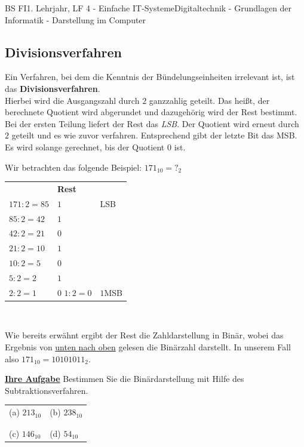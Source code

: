 \documentclass[11pt,twocolumn,oneside,openany,headings=optiontotoc,11pt,numbers=noenddot]{article}
\begin{document}
\begin{worksheet}{BS FI}{1. Lehrjahr, LF 4 - Einfache IT-Systeme}{Digitaltechnik - Grundlagen der Informatik - Darstellung im Computer}
	 	\subsection*{Divisionsverfahren}
	 	Ein Verfahren, bei dem die Kenntnis der Bündelungseinheiten irrelevant ist, ist das \textbf{Divisionsverfahren}.\\
	 	Hierbei wird die Ausgangszahl durch \(2\) ganzzahlig geteilt. Das heißt, der berechnete Quotient wird abgerundet und dazugehörig wird der Rest bestimmt. Bei der ersten Teilung liefert der Rest das \textit{LSB}. Der Quotient wird erneut durch \(2\) geteilt und es wie zuvor verfahren. Entsprechend gibt der letzte Bit das MSB.\\
	 	Es wird solange gerechnet, bis der Quotient \(0\) ist.\\
	 	\par\noindent
	 	Wir betrachten das folgende Beispiel: \(171_{10} = ?_{2}\)\\
	 	\begin{tabularx}{0.45\textwidth}{XMl}
	 		& \textbf{Rest} & \\
	 		\(171 : 2 = 85\) & \(1\) & LSB\\
	 		\(85 : 2 = 42\) & \(1\)\\
	 		\(42 : 2 = 21\) & \(0\)\\
	 		\(21 : 2 = 10\) & \(1\)\\
	 		\(10 : 2 = 5\) & \(0\)\\
	 		\(5 : 2 = 2\) & \(1\)\\
	 		\(2 : 2 = 1\) & \(0\)
	 		\(1 : 2 = 0\) & \(1\)MSB\\
	 	\end{tabularx}\\
	 	\par\noindent
 		Wie bereits erwähnt ergibt der Rest die Zahldarstellung in Binär, wobei das Ergebnis von \underline{unten nach oben} gelesen die Binärzahl darstellt. In unserem Fall also \colorbox{green!10}{\(171_{10} = 10101011_{2}\)}.\\
 		\par\noindent
 		\textbf{\underline{Ihre Aufgabe}} Bestimmen Sie die Binärdarstellung mit Hilfe des Subtraktionsverfahren.\\
 		\par\bigskip\noindent
 		\begin{tabularx}{0.45\textwidth}{M|M}
 			(a) \(213_{10}\) & (b) \(238_{10}\)\\
 			& \\
 			\hline
 			& \\
 			(c) \(146_{10}\) & (d) \(54_{10}\)\\
 		\end{tabularx}
	\end{worksheet}
\end{document}
